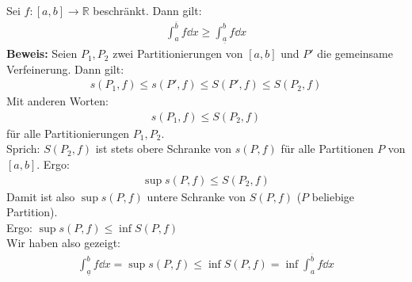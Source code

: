 \begin{Satz}{
	Sei $f: [a,b] \rightarrow \mathbb{R}$ beschränkt. Dann gilt:
	\begin{align*}
		\int_a^{\overline{b}} f \dd{x} \geq \int_{\underline{a}}^b f \dd{x}
	\end{align*}
	\textbf{Beweis:} Seien $P_1, P_2$ zwei Partitionierungen von $[a,b]$ und 
	$P'$ die gemeinsame Verfeinerung. Dann gilt:
	\begin{align*}
		s(P_1,f) \leq s(P',f) \leq S(P',f) \leq S(P_2, f) 
	\end{align*}
	Mit anderen Worten:
	\begin{align*}
		s(P_1, f) \leq S(P_2, f)
	\end{align*}
	für alle Partitionierungen $P_1, P_2$. \\
	Sprich: $S(P_2,f)$ ist stets obere Schranke von $s(P,f)$ für alle Partitionen 
	$P$ von $[a,b]$. Ergo:
	\begin{align*}
		\sup s(P,f) \leq S (P_2, f)
	\end{align*}
	Damit ist also $\sup s(P,f)$ untere Schranke von $S(P,f)$ ($P$ beliebige 
	Partition). \\
	Ergo: $\sup s(P,f) \leq \inf S (P,f)$  \\
	Wir haben also gezeigt:
	\begin{align*}
		\int_{\underline{a}}^b f \dd{x} = \sup s(P,f) \leq 
		\inf S(P,f) = \inf \int_a^{\overline{b}} f \dd{x}
	\end{align*}
}\end{Satz}